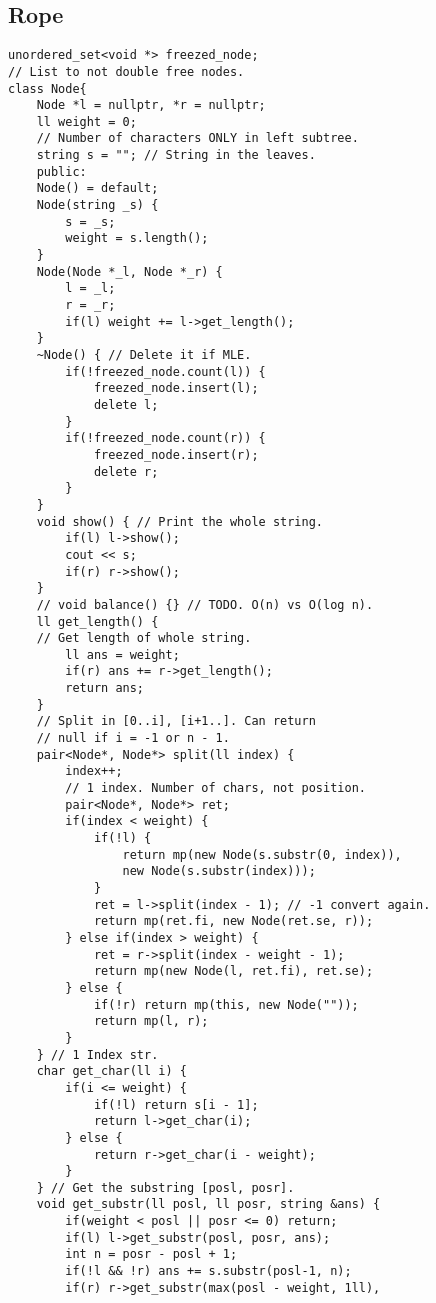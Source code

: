 \documentclass[a4paper]{article}
\begin{document}
\subsection*{Rope}
\begin{multicols}{2}
\begin{verbatim}
unordered_set<void *> freezed_node;
// List to not double free nodes.
class Node{
    Node *l = nullptr, *r = nullptr;
    ll weight = 0;
    // Number of characters ONLY in left subtree.
    string s = ""; // String in the leaves.
    public:
    Node() = default;
    Node(string _s) {
        s = _s;
        weight = s.length();
    }
    Node(Node *_l, Node *_r) {
        l = _l;
        r = _r;
        if(l) weight += l->get_length();
    }
    ~Node() { // Delete it if MLE.
        if(!freezed_node.count(l)) {
            freezed_node.insert(l);
            delete l;
        }
        if(!freezed_node.count(r)) {
            freezed_node.insert(r);
            delete r;
        }
    }
    void show() { // Print the whole string.
        if(l) l->show();
        cout << s;
        if(r) r->show();
    }
    // void balance() {} // TODO. O(n) vs O(log n).
    ll get_length() {
    // Get length of whole string.
        ll ans = weight;
        if(r) ans += r->get_length();
        return ans;
    }
    // Split in [0..i], [i+1..]. Can return
    // null if i = -1 or n - 1.
    pair<Node*, Node*> split(ll index) { 
        index++;
        // 1 index. Number of chars, not position.
        pair<Node*, Node*> ret;
        if(index < weight) {
            if(!l) {
                return mp(new Node(s.substr(0, index)),
                new Node(s.substr(index)));
            }
            ret = l->split(index - 1); // -1 convert again.
            return mp(ret.fi, new Node(ret.se, r));
        } else if(index > weight) {
            ret = r->split(index - weight - 1);
            return mp(new Node(l, ret.fi), ret.se);
        } else {
            if(!r) return mp(this, new Node(""));
            return mp(l, r);
        }
    } // 1 Index str.
    char get_char(ll i) {
        if(i <= weight) {
            if(!l) return s[i - 1];
            return l->get_char(i);
        } else {
            return r->get_char(i - weight);
        }
    } // Get the substring [posl, posr].
    void get_substr(ll posl, ll posr, string &ans) {
        if(weight < posl || posr <= 0) return;
        if(l) l->get_substr(posl, posr, ans);
        int n = posr - posl + 1;
        if(!l && !r) ans += s.substr(posl-1, n);
        if(r) r->get_substr(max(posl - weight, 1ll),

\end{verbatim}
\end{multicols}
\end{document}
